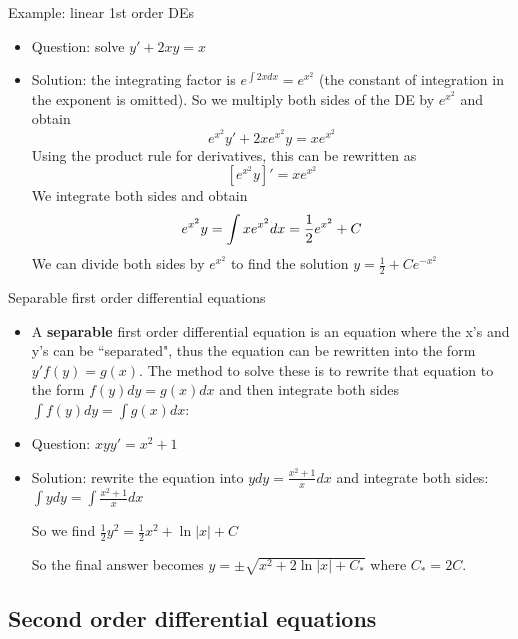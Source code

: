 \begin{frame}{Example: linear 1st order DEs}
    \begin{itemize}
        \item\pause Question: solve $y'+2x y=x$
        \item\pause Solution: the integrating factor is $e^{\int 2xdx}=e^{x^2}$ (the constant of integration in the exponent is omitted). So we multiply both sides of the DE by $e^{x^2}$ and obtain \[e^{x^2}y'+2xe^{x^2}y=xe^{x^2}\]
        Using the product rule for derivatives, this can be rewritten as \[\left[e^{x^2}y\right]'=xe^{x^2}\]
        We integrate both sides and obtain \[e^{x^2}y=\int xe^{x^2} dx = \frac{1}{2}e^{x^2}+C\vspace{-1.5mm}\]
        \vspace{-1.5mm}We can divide both sides by $e^{x^2}$ to find the solution $\boxed{y=\frac{1}{2}+Ce^{-x^2}}$
    \end{itemize}

\end{frame}

\begin{frame}{Separable first order differential equations}
    \begin{itemize}
        \item A \textbf{separable} first order differential equation is an equation where the x's and y's can be ``separated", thus the equation can be rewritten into the form $y'f(y)=g(x)$. The method to solve these is to rewrite that equation to the form $f(y)dy=g(x)dx$ and then integrate both sides $\int f(y)dy=\int g(x)dx$:
        \item\pause Question: $xyy'=x^2+1$
        \item\pause Solution: rewrite the equation into $ydy=\frac{x^2+1}{x}dx$ and integrate both sides: $\int ydy=\int\frac{x^2+1}{x}dx$\pause

        So we find $\frac{1}{2}y^2=\frac{1}{2}x^2+\ln\left|x\right|+C$ \pause
        
        So the final answer becomes $\boxed{y=\pm\sqrt{x^2+2\ln \left|x\right| + C_*}}$ where $C_*=2C$.
    \end{itemize}

\end{frame}


\subsection{Second order differential equations}

